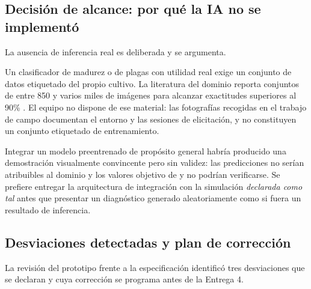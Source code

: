 \subsection{Decisión de alcance: por qué la IA no se implementó}

La ausencia de inferencia real es deliberada y se argumenta.

Un clasificador de madurez o de plagas con utilidad real exige un conjunto de datos etiquetado del
propio cultivo. La literatura del dominio reporta conjuntos de entre 850 y varios miles de imágenes
para alcanzar exactitudes superiores al 90\% \cite{suharjito2021,omar2024,rosbi2024}. El equipo no
dispone de ese material: las fotografías recogidas en el trabajo de campo documentan el entorno y
las sesiones de elicitación, y no constituyen un conjunto etiquetado de entrenamiento.

Integrar un modelo preentrenado de propósito general habría producido una demostración visualmente
convincente pero sin validez: las predicciones no serían atribuibles al dominio y los valores
objetivo de  y  no podrían verificarse. Se prefiere entregar la arquitectura
de integración con la simulación \emph{declarada como tal} antes que presentar un diagnóstico
generado aleatoriamente como si fuera un resultado de inferencia.

\subsection{Desviaciones detectadas y plan de corrección}

La revisión del prototipo frente a la especificación identificó tres desviaciones que se declaran y
cuya corrección se programa antes de la Entrega 4.

